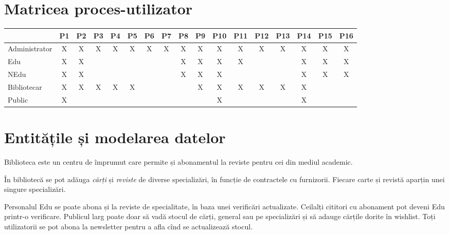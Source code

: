 
\section{Matricea proces-utilizator}
\label{sec:matrice-pu}

\begin{center}
  \small
  \begin{tabular}{|l|c|c|c|c|c|c|c|c|c|c|c|c|c|c|c|c|}
    \hline
    & P1 & P2 & P3 & P4 & P5 & P6 & P7 & P8 & P9 & P10 & P11 & P12 & P13 & P14 & P15 & P16 \\
    \hline \hline
    Administrator & X & X & X & X & X & X & X & X & X & X & X & X & X & X & X & X \\
    \hline
    Edu & X & X & & & & & & X & X & X & X & & & X & X & X \\
    \hline
    NEdu & X & X & & & & & & X & X & X & & & & X & X & X \\
    \hline
    Bibliotecar & X & X & X & X & X & & & & X & X & X & X & X & X & & \\
    \hline
    Public & X & & & & & & & & & X & & & & X & & \\
    \hline
  \end{tabular}
\end{center}


\section{Entitățile și modelarea datelor}
\label{sec:ent-model}

Biblioteca este un centru de împrumut care permite și abonamentul la reviste
pentru cei din mediul academic.

În bibliotecă se pot adăuga \emph{cărți} și \emph{reviste} de diverse
specializări, în funcție de contractele cu furnizorii. Fiecare
carte și revistă aparțin unei singure specializări.

Personalul Edu se poate abona și la reviste de specialitate, în baza
unei verificări actualizate. Ceilalți cititori cu abonament pot deveni
Edu printr-o verificare. Publicul larg poate doar să vadă stocul
de cărți, general sau pe specializări și să adauge cărțile dorite
în wishlist. Toți utilizatorii se pot abona la newsletter pentru a
afla cînd se actualizează stocul.

